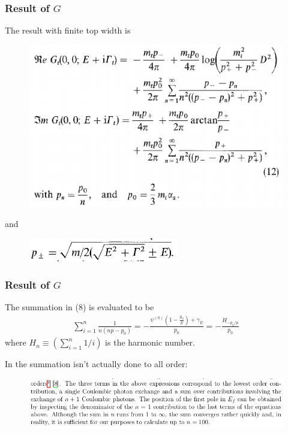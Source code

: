 \documentclass[8pt,dvipsnames,table]{beamer}
\begin{document}
\begin{frame}
	\frametitle{Result of $G$}

	The result with finite top width is
	\begin{figure}[!htb]
		\centering
		\includegraphics[width=.8\linewidth]{image9.png}
		\label{fig:image9}
	\end{figure}
	and
	\begin{figure}[!htb]
		\centering
		\includegraphics[width=.5\linewidth]{image10.png}
		\label{fig:image10}
	\end{figure}


\end{frame}

\begin{frame}
	\frametitle{Result of $G$}

	The summation in (8) is evaluated to be
	\begin{align}
		\sum_{i=1}^n\frac{1}{n(np-p_0)}=-\frac{\psi ^{(0)}\left(1-\frac{p_0}{p}\right)+\gamma_E }{p_0}=-\frac{H_{-p_{0}/p}}{p_0}
	\end{align}
	where $H_n\equiv\left(\sum_{i=1}^n1/i\right)$ is the harmonic number.

	In \citep{Bharucha:2016jyr} the summation isn't actually done to all order:
	\begin{figure}[!htb]
		\centering
		\includegraphics[width=\linewidth]{image40.png}
		\label{fig:image40}
	\end{figure}


\end{frame}
\end{document}
